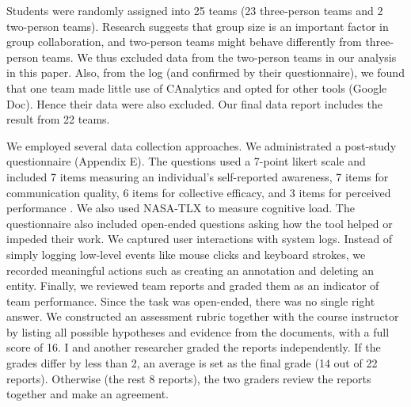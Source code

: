 Students were randomly assigned into 25 teams (23 three-person teams and 2
two-person teams). Research suggests that group size is an important factor in
group collaboration, and two-person teams might behave differently from
three-person teams. We thus excluded data from the two-person teams in our
analysis in this paper. Also, from the log (and confirmed by their
questionnaire), we found that one team made little use of CAnalytics and opted
for other tools (Google Doc). Hence their data were also excluded. Our final data report includes the result from 22 teams.

We employed several data collection approaches. We administrated a post-study
questionnaire (Appendix E). The questions used a 7-point likert scale and included 7 items measuring an individual's
self-reported awareness, 7 items for
communication quality, 6 items for collective efficacy, and 3 items for perceived performance \citep{Convertino2011}. We also used NASA-TLX \citep{Hart1988} to measure cognitive load. The questionnaire
also included open-ended questions asking how the tool helped or impeded their
work. We captured user interactions with system logs. Instead of simply logging
low-level events like mouse clicks and keyboard strokes, we recorded meaningful actions such
as creating an annotation and deleting an entity. Finally, we reviewed team
reports and graded them as an indicator of team performance. Since the task was
open-ended, there was no single right answer. We constructed an assessment
rubric together with the course instructor by listing all possible hypotheses
and evidence from the documents, with a full score of 16. I and another researcher graded the reports independently. If the grades differ by
less than 2, an average is set as the final grade (14 out of 22 reports).
Otherwise (the rest 8 reports), the two graders review the reports together and
make an agreement.
